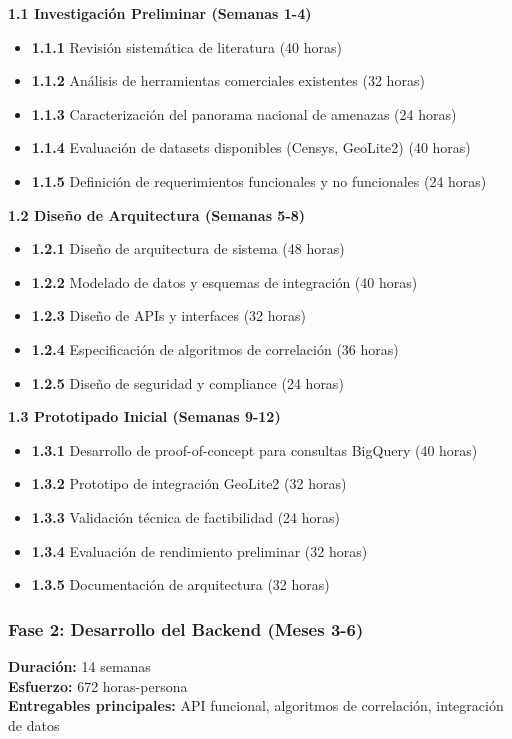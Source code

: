 \textbf{1.1 Investigación Preliminar (Semanas 1-4)}
\begin{itemize}
    \item \textbf{1.1.1} Revisión sistemática de literatura (40 horas)
    \item \textbf{1.1.2} Análisis de herramientas comerciales existentes (32 horas)
    \item \textbf{1.1.3} Caracterización del panorama nacional de amenazas (24 horas)
    \item \textbf{1.1.4} Evaluación de datasets disponibles (Censys, GeoLite2) (40 horas)
    \item \textbf{1.1.5} Definición de requerimientos funcionales y no funcionales (24 horas)
\end{itemize}

\textbf{1.2 Diseño de Arquitectura (Semanas 5-8)}
\begin{itemize}
    \item \textbf{1.2.1} Diseño de arquitectura de sistema (48 horas)
    \item \textbf{1.2.2} Modelado de datos y esquemas de integración (40 horas)
    \item \textbf{1.2.3} Diseño de APIs y interfaces (32 horas)
    \item \textbf{1.2.4} Especificación de algoritmos de correlación (36 horas)
    \item \textbf{1.2.5} Diseño de seguridad y compliance (24 horas)
\end{itemize}

\textbf{1.3 Prototipado Inicial (Semanas 9-12)}
\begin{itemize}
    \item \textbf{1.3.1} Desarrollo de proof-of-concept para consultas BigQuery (40 horas)
    \item \textbf{1.3.2} Prototipo de integración GeoLite2 (32 horas)
    \item \textbf{1.3.3} Validación técnica de factibilidad (24 horas)
    \item \textbf{1.3.4} Evaluación de rendimiento preliminar (32 horas)
    \item \textbf{1.3.5} Documentación de arquitectura (32 horas)
\end{itemize}

\subsubsection{Fase 2: Desarrollo del Backend (Meses 3-6)}
\textbf{Duración:} 14 semanas \\
\textbf{Esfuerzo:} 672 horas-persona \\
\textbf{Entregables principales:} API funcional, algoritmos de correlación, integración de datos

